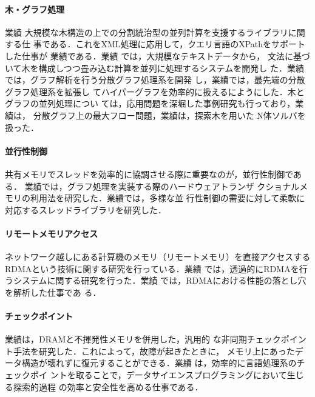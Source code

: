 \documentclass[dvipdfmx]{jsarticle}
\begin{document}
\paragraph{木・グラフ処理}
業績\cite{ijpp16:tree_skel,jssst16:nbody_locality,jssst14:par_traversal}
大規模な木構造の上での分割統治型の並列計算を支援するライブラリに関する仕
事である．これをXML処理に応用して，クエリ言語のXPathをサポートした仕事が
業績\cite{adbis18:par_xpath,cloudcomp20:xpath}である．業績
\cite{pro19o:centaurus,jip20:centaurus}では，大規模なテキストデータから，
文法に基づいて木を構成しつつ畳み込む計算を並列に処理するシステムを開発し
た．業績\cite{fhpc16:s6raph}では，グラフ解析を行う分散グラフ処理系を開発
し，業績\cite{jip21:hyper_gemini}では，最先端の分散グラフ処理系を拡張し
てハイパーグラフを効率的に扱えるにようにした．木とグラフの並列処理につい
ては，応用問題を深堀した事例研究も行っており，業績\cite{ngc18:pregel}は，
分散グラフ上の最大フロー問題，業績\cite{ispass22:vipp}は，探索木を用いた
N体ソルバを扱った．

\paragraph{並行性制御}
共有メモリでスレッドを効率的に協調させる際に重要なのが，並行性制御である．
業績\cite{icpp15:htm}では，グラフ処理を実装する際のハードウェアトランザ
クショナルメモリの利用法を研究した．業績\cite{jip22:compth}では，多様な並
行性制御の需要に対して柔軟に対応するスレッドライブラリを研究した．

\paragraph{リモートメモリアクセス}
ネットワーク越しにある計算機のメモリ（リモートメモリ）を直接アクセスする
RDMAという技術に関する研究を行っている．業績
\cite{ipdrm20:menps,jip22:argodsm,pro22o:far_memory,ppl23c3:far_memory,ppl23c3:redn}
では，透過的にRDMAを行うシステムに関する研究を行った．業績
\cite{ispass21:ib_odp}では，RDMAにおける性能の落とし穴を解析した仕事であ
る．

\paragraph{チェックポイント}
業績\cite{jssst22:checkpoint}は，DRAMと不揮発性メモリを併用した，汎用的
な非同期チェックポイント手法を研究した．これによって，故障が起きたときに，
メモリ上にあったデータ構造が壊れずに復元することができる．業績
\cite{splash22:mvnb,ppl23:notebook}は，効率的に言語処理系のチェックポイ
ントを取ることで，データサイエンスプログラミングにおいて生じる探索的過程
の効率と安全性を高める仕事である．
\end{document}
